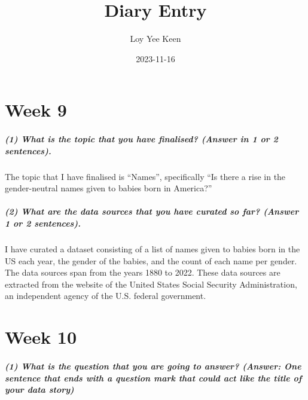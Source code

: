 \documentclass[
]{article}
\title{Diary Entry}
\author{Loy Yee Keen}
\date{2023-11-16}
\begin{document}
\maketitle

\hypertarget{week-9}{%
\section{Week 9}\label{week-9}}

\hypertarget{what-is-the-topic-that-you-have-finalised-answer-in-1-or-2-sentences.}{%
\subparagraph{\texorpdfstring{\textbf{(1) What is the topic that you
have finalised? (Answer in 1 or 2
sentences).}}{(1) What is the topic that you have finalised? (Answer in 1 or 2 sentences).}}\label{what-is-the-topic-that-you-have-finalised-answer-in-1-or-2-sentences.}}

The topic that I have finalised is ``Names'', specifically ``Is there a
rise in the gender-neutral names given to babies born in America?''

\hypertarget{what-are-the-data-sources-that-you-have-curated-so-far-answer-1-or-2-sentences.}{%
\subparagraph{\texorpdfstring{\textbf{(2) What are the data sources that
you have curated so far? (Answer 1 or 2
sentences).}}{(2) What are the data sources that you have curated so far? (Answer 1 or 2 sentences).}}\label{what-are-the-data-sources-that-you-have-curated-so-far-answer-1-or-2-sentences.}}

I have curated a dataset consisting of a list of names given to babies
born in the US each year, the gender of the babies, and the count of
each name per gender. The data sources span from the years 1880 to 2022.
These data sources are extracted from the website of the United States
Social Security Administration, an independent agency of the U.S.
federal government.

\hypertarget{week-10}{%
\section{Week 10}\label{week-10}}

\hypertarget{what-is-the-question-that-you-are-going-to-answer-answer-one-sentence-that-ends-with-a-question-mark-that-could-act-like-the-title-of-your-data-story}{%
\subparagraph{\texorpdfstring{\textbf{(1) What is the question that you
are going to answer? (Answer: One sentence that ends with a question
mark that could act like the title of your data
story)}}{(1) What is the question that you are going to answer? (Answer: One sentence that ends with a question mark that could act like the title of your data story)}}\label{what-is-the-question-that-you-are-going-to-answer-answer-one-sentence-that-ends-with-a-question-mark-that-could-act-like-the-title-of-your-data-story}}
\end{document}
